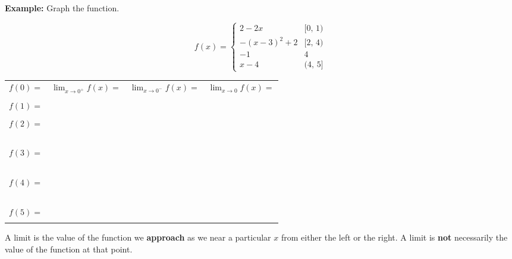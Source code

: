 \documentclass[addpoints, 12pt]{exam}
\begin{document}
\noindent\textbf{Example:} Graph the function.\\
\begin{minipage}{0.30\linewidth}
    \[f(x)=
        \begin{cases}
        2-2x        &   [0,\,1)\\
        -(x-3)^2+2  &   [2,\,4)\\
        -1          &   4\\
        x-4         &   (4,\,5]
        \end{cases}
    \]
\end{minipage}
\hfill
\begin{minipage}{0.65\linewidth}
    \begin{center}
    \end{center}
\end{minipage}

\begin{longtable}{|m{3.667cm}|m{3.667cm}|m{3.667cm}|m{3.7cm}|}
    \hline
    $\displaystyle f(0)=$   &   $\displaystyle\lim_{x\to0^+}f(x)=$  &   $\displaystyle\lim_{x\to0^-}f(x)=$  &   $\displaystyle\lim_{x\to0}f(x)=$ \\
                            &   &   &   \\\hline
    $\displaystyle f(1)=$   &   &   &   \\
                            &   &   &   \\\hline
    $\displaystyle f(2)=$   &   &   &   \\\
                            &   &   &   \\\hline
    $\displaystyle f(3)=$   &   &   &   \\\
                            &   &   &   \\\hline
    $\displaystyle f(4)=$   &   &   &   \\\
                            &   &   &   \\\hline
    $\displaystyle f(5)=$   &   &   &   \\
                            &   &   &   \hline
\end{longtable}

\newpage

A limit is the value of the function we \textbf{approach} as we near a particular $x$ from either the left or the right. A limit is \textbf{not} necessarily the value of the function at that point.
\end{document}
